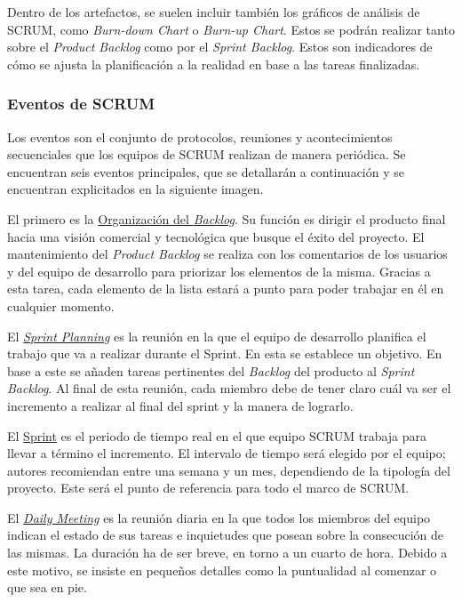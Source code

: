 Dentro de los artefactos, se suelen incluir también los gráficos de análisis de SCRUM, como \textit{Burn-down Chart} o \textit{Burn-up Chart}. Estos se podrán realizar tanto sobre el \textit{Product Backlog} como por el \textit{Sprint Backlog}. Estos son indicadores de cómo se ajusta la planificación a la realidad en base a las tareas finalizadas.

\subsubsection{Eventos de SCRUM}

Los eventos son el conjunto de protocolos, reuniones y acontecimientos secuenciales que los equipos de SCRUM realizan de manera periódica. Se encuentran seis eventos principales, que se detallarán a continuación y se encuentran explicitados en la siguiente imagen.


El primero es la \underline{Organización del \textit{Backlog}}. Su función es dirigir el producto final hacia una visión comercial y tecnológica que busque el éxito del proyecto. El mantenimiento del \textit{Product Backlog} se realiza con los comentarios de los usuarios y del equipo de desarrollo para priorizar los elementos de la misma. Gracias a esta tarea, cada elemento de la lista estará a punto para poder trabajar en él en cualquier momento.

El \underline{\textit{Sprint Planning}} es la reunión en la que el equipo de desarrollo planifica el trabajo que va a realizar durante el Sprint. En esta se establece un objetivo. En base a este se añaden tareas pertinentes del \textit{Backlog} del producto al \textit{Sprint Backlog}. Al final de esta reunión, cada miembro debe de tener claro cuál va ser el incremento a realizar al final del sprint y la manera de lograrlo.

El \underline{Sprint} es el periodo de tiempo real en el que equipo SCRUM trabaja para llevar a término el incremento. El intervalo de tiempo será elegido por el equipo; autores recomiendan entre una semana y un mes, dependiendo de la tipología del proyecto. Este será el punto de referencia para todo el marco de SCRUM.

El \underline{\textit{Daily Meeting}} es la reunión diaria en la que todos los miembros del equipo indican el estado de sus tareas e inquietudes que posean sobre la consecución de las mismas. La duración ha de ser breve, en torno a un cuarto de hora. Debido a este motivo, se insiste en pequeños detalles como la puntualidad al comenzar o que sea en pie.

